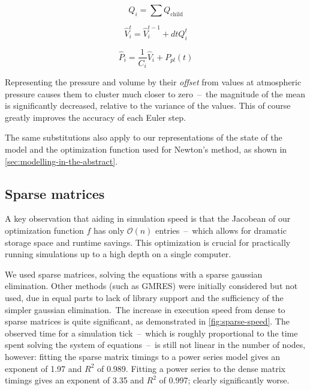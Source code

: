 \begin{equation}
    Q_i = \sum Q_{\text{child}}
\end{equation}

\begin{equation}
    \hat{V}_i^t = \hat{V}_i^{t-1} + dt Q_i^t
\end{equation}

\begin{equation}
    \hat{P}_i = \frac{1}{C_i} \hat{V}_i + P_{pl}(t)
\end{equation}

Representing the pressure and volume by their \textit{offset} from values at atmospheric pressure
causes them to cluster much closer to zero~--~the magnitude of the mean is significantly decreased,
relative to the variance of the values. This of course greatly improves the accuracy of each Euler
step.

The same substitutions also apply to our representations of the state of the model and the
optimization function used for Newton's method, as shown in \autoref{sec:modelling-in-the-abstract}.

\subsection{Sparse matrices}

A key observation that aiding in simulation speed is that the Jacobean of our optimization function
$f$ has only $\mathcal{O}(n)$ entries~--~which allows for dramatic storage space and runtime
savings. This optimization is crucial for practically running simulations up to a high depth on a
single computer.

We used sparse matrices, solving the equations with a sparse gaussian elimination. Other methods
(such as GMRES) were initially considered but not used, due in equal parts to lack of library
support and the sufficiency of the simpler gaussian elimination.\footnotemark\ The increase in
execution speed from dense to sparse matrices is quite significant, as demonstrated in
\autoref{fig:sparse-speed}. The observed time for a simulation tick~--~which is roughly proportional
to the time spent solving the system of equations~--~is still not linear in the number of nodes,
however: fitting the sparse matrix timings to a power series model gives an exponent of 1.97 and
$R^2$ of 0.989. Fitting a power series to the dense matrix timings gives an exponent of 3.35 and
$R^2$ of 0.997; clearly significantly worse.


